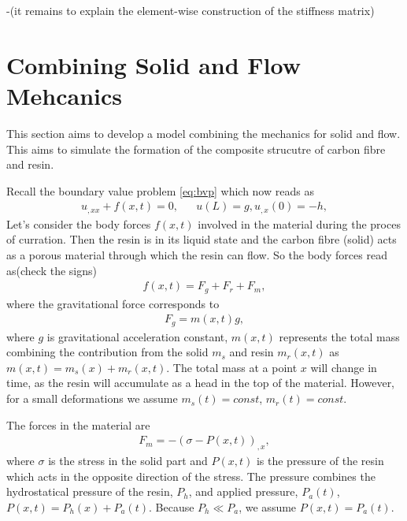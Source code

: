\documentclass[twoside,a4paper,12pt]{article}
\newcommand{\note}[1]{{\color{red}\newline(#1)}}
\newcommand{\+}[2]{\newcommand#1{{\color{\notcolor}#2}}}
\newcommand{\1}[2]{\newcommand{#1}[1]{{\color{\notcolor}#2}}}
\newcommand{\2}[2]{\newcommand{#1}[2]{{\color{\notcolor}#2}}}
\begin{document}
-\note{it remains to explain the element-wise construction of the stiffness matrix}

\section{Combining Solid and Flow Mehcanics}

This section aims to develop a model combining the mechanics for solid and flow. This aims to simulate the formation of the composite strucutre of carbon fibre and resin. 

Recall the boundary value problem \eqref{eq:bvp}  which now reads as
%
\begin{align}
  u_{,xx} + f(x,t) = 0, \label{eq:bvp-t}
  &&u(L) = g, u_{,x}(0) = -h,
\end{align}
%
Let's consider the body forces $f(x,t)$ involved in the material
during the proces of curration. Then the resin is in its liquid state
and the carbon fibre (solid) acts as a porous material through which
the resin can flow. So the body forces read as\note{check the signs}
%
\begin{align}
  f(x,t) = F_g + F_r + F_m      , \label{eq:const}
\end{align}
%
where the gravitational force corresponds to
%
\begin{align}
F_g = m(x,t) g, \label{eq:grav-force}
\end{align}
%
where $g$ is gravitational acceleration constant, $m(x,t)$ represents
the total mass combining the contribution from the solid $m_s$ and
resin $m_r(x,t)$ as $m(x,t) = m_s(x) + m_r(x,t)$. The total mass at a
point $x$ will change in time, as the resin will accumulate as a head
in the top of the material. However, for a small deformations we
assume $m_s(t) = const$, $m_r(t)=const$.

The forces in the material are 
\begin{align}
  F_m = - (\sigma -  P(x,t))_{,x}, \label{eq:force-material}
\end{align}
%
where $\sigma$ is the stress in the solid part and $P(x,t)$ is the
pressure of the resin which acts in the opposite direction of the
stress. The pressure combines the hydrostatical pressure of the resin,
$P_h$, and applied pressure, $P_a(t)$, $P(x,t) = P_h(x) + P_a(t)
$. Because $P_h \ll P_a$, we assume $P(x,t) = P_a(t)$.
\end{document}
